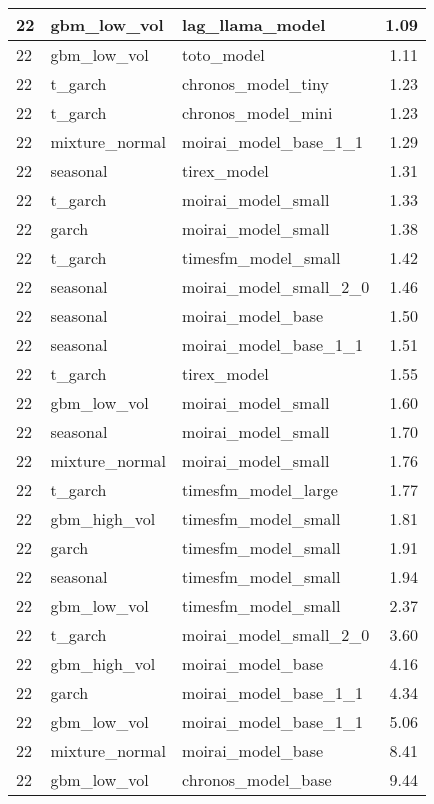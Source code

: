 {\begin{tabular}{lllr}
\midrule
22 & gbm\_low\_vol & lag\_llama\_model & 1.09 \\
\midrule
22 & gbm\_low\_vol & toto\_model & 1.11 \\
\midrule
22 & t\_garch & chronos\_model\_tiny & 1.23 \\
\midrule
22 & t\_garch & chronos\_model\_mini & 1.23 \\
\midrule
22 & mixture\_normal & moirai\_model\_base\_1\_1 & 1.29 \\
\midrule
22 & seasonal & tirex\_model & 1.31 \\
\midrule
22 & t\_garch & moirai\_model\_small & 1.33 \\
\midrule
22 & garch & moirai\_model\_small & 1.38 \\
\midrule
22 & t\_garch & timesfm\_model\_small & 1.42 \\
\midrule
22 & seasonal & moirai\_model\_small\_2\_0 & 1.46 \\
\midrule
22 & seasonal & moirai\_model\_base & 1.50 \\
\midrule
22 & seasonal & moirai\_model\_base\_1\_1 & 1.51 \\
\midrule
22 & t\_garch & tirex\_model & 1.55 \\
\midrule
22 & gbm\_low\_vol & moirai\_model\_small & 1.60 \\
\midrule
22 & seasonal & moirai\_model\_small & 1.70 \\
\midrule
22 & mixture\_normal & moirai\_model\_small & 1.76 \\
\midrule
22 & t\_garch & timesfm\_model\_large & 1.77 \\
\midrule
22 & gbm\_high\_vol & timesfm\_model\_small & 1.81 \\
\midrule
22 & garch & timesfm\_model\_small & 1.91 \\
\midrule
22 & seasonal & timesfm\_model\_small & 1.94 \\
\midrule
22 & gbm\_low\_vol & timesfm\_model\_small & 2.37 \\
\midrule
22 & t\_garch & moirai\_model\_small\_2\_0 & 3.60 \\
\midrule
22 & gbm\_high\_vol & moirai\_model\_base & 4.16 \\
\midrule
22 & garch & moirai\_model\_base\_1\_1 & 4.34 \\
\midrule
22 & gbm\_low\_vol & moirai\_model\_base\_1\_1 & 5.06 \\
\midrule
22 & mixture\_normal & moirai\_model\_base & 8.41 \\
\midrule
22 & gbm\_low\_vol & chronos\_model\_base & 9.44 \\
\bottomrule
\end{tabular}
}